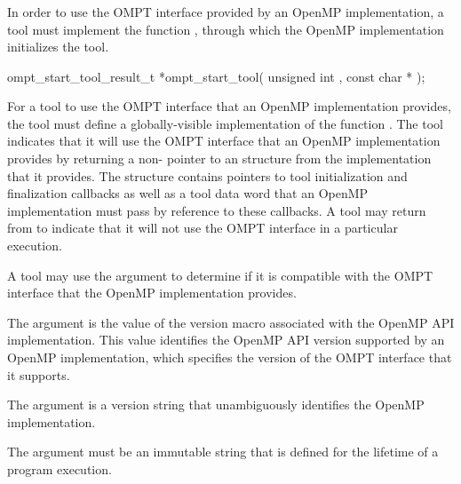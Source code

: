 \subsubsection{}
\label{sec:ompt_start_tool}

\summary
In order to use the OMPT interface provided by an OpenMP implementation,
a tool must implement the function , through which 
the OpenMP implementation initializes the tool.

\format
\begin{cspecific}
\begin{omptOther}
ompt_start_tool_result_t *ompt_start_tool(
  unsigned int ,
  const char *
);
\end{omptOther}
\end{cspecific}


\descr
For a tool to use the OMPT interface that an OpenMP implementation provides,
the tool must define a globally-visible implementation of the
function . The tool indicates that it will use the OMPT 
interface that an OpenMP implementation provides by returning a non- 
pointer to an  structure from the 
 implementation that it provides. The 
 structure contains pointers to tool initialization 
and finalization callbacks as well as a tool data word that an OpenMP implementation 
must pass by reference to these callbacks. A tool may return  from 
 to indicate that it will not use the OMPT interface in 
a particular execution.

A tool may use the  argument to determine if it is compatible with 
the OMPT interface that the OpenMP implementation provides.

\argdesc

The argument 
is the value of the  version macro
associated with the OpenMP API implementation. This value
identifies the OpenMP API version supported by an OpenMP implementation,
which specifies the version of the OMPT interface that it supports.

The argument 
is a version string that unambiguously identifies the OpenMP implementation.

\constraints

The argument  must be
an immutable string that is defined for the lifetime of a program
execution.


